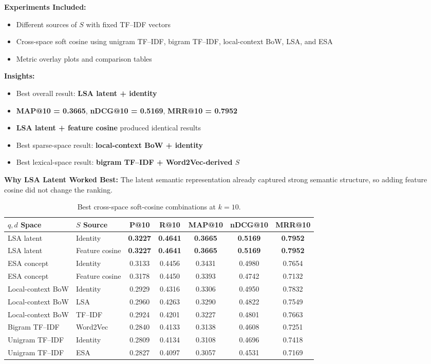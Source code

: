 \documentclass[runningheads]{llncs}
\begin{document}
\textbf{Experiments Included:}
\begin{itemize}[noitemsep]
    \item Different sources of $S$ with fixed TF--IDF vectors
    \item Cross-space soft cosine using unigram TF--IDF, bigram TF--IDF, local-context BoW, LSA, and ESA
    \item Metric overlay plots and comparison tables
\end{itemize}

\textbf{Insights:}
\begin{itemize}[noitemsep]
    \item Best overall result: \textbf{LSA latent + identity}
    \item \textbf{MAP@10 = 0.3665}, \textbf{nDCG@10 = 0.5169}, \textbf{MRR@10 = 0.7952}
    \item \textbf{LSA latent + feature cosine} produced identical results
    \item Best sparse-space result: \textbf{local-context BoW + identity}
    \item Best lexical-space result: \textbf{bigram TF--IDF + Word2Vec-derived $S$}
\end{itemize}

\textbf{Why LSA Latent Worked Best:}  
The latent semantic representation already captured strong semantic structure, so adding feature cosine did not change the ranking.

\begin{table}[h]
\centering
\begin{tabular}{llccccc}
\toprule
\textbf{$q,d$ Space} & \textbf{$S$ Source} & \textbf{P@10} & \textbf{R@10} & \textbf{MAP@10} & \textbf{nDCG@10} & \textbf{MRR@10} \\
\midrule
LSA latent & Identity & \textbf{0.3227} & \textbf{0.4641} & \textbf{0.3665} & \textbf{0.5169} & \textbf{0.7952} \\
LSA latent & Feature cosine & \textbf{0.3227} & \textbf{0.4641} & \textbf{0.3665} & \textbf{0.5169} & \textbf{0.7952} \\
ESA concept & Identity & 0.3133 & 0.4456 & 0.3431 & 0.4980 & 0.7654 \\
ESA concept & Feature cosine & 0.3178 & 0.4450 & 0.3393 & 0.4742 & 0.7132 \\
Local-context BoW & Identity & 0.2929 & 0.4316 & 0.3306 & 0.4950 & 0.7832 \\
Local-context BoW & LSA & 0.2960 & 0.4263 & 0.3290 & 0.4822 & 0.7549 \\
Local-context BoW & TF--IDF & 0.2924 & 0.4201 & 0.3227 & 0.4801 & 0.7663 \\
Bigram TF--IDF & Word2Vec & 0.2840 & 0.4133 & 0.3138 & 0.4608 & 0.7251 \\
Unigram TF--IDF & Identity & 0.2809 & 0.4134 & 0.3108 & 0.4696 & 0.7418 \\
Unigram TF--IDF & ESA & 0.2827 & 0.4097 & 0.3057 & 0.4531 & 0.7169 \\
\bottomrule
\end{tabular}
\caption{Best cross-space soft-cosine combinations at $k=10$.}
\label{tab:cross_space_soft_cosine}
\end{table}
\end{document}
